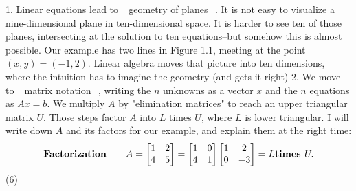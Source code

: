 1. Linear equations lead to _geometry of planes_. It is not easy to visualize a nine-dimensional plane in ten-dimensional space. It is harder to see ten of those planes, intersecting at the solution to ten equations--but somehow this is almost possible. Our example has two lines in Figure 1.1, meeting at the point \((x,y)=(-1,2)\). Linear algebra moves that picture into ten dimensions, where the intuition has to imagine the geometry (and gets it right)
2. We move to _matrix notation_, writing the \(n\) unknowns as a vector \(x\) and the \(n\) equations as \(Ax=b\). We multiply \(A\) by "elimination matrices" to reach an upper triangular matrix \(U\). Those steps factor \(A\) into \(L\) times \(U\), where \(L\) is lower triangular. I will write down \(A\) and its factors for our example, and explain them at the right time: \[\text{\bf Factorization}\qquad A=\begin{bmatrix}1&2\\ 4&5\end{bmatrix}=\begin{bmatrix}1&0\\ 4&1\end{bmatrix}\begin{bmatrix}1&2\\ 0&-3\end{bmatrix}=L\text{\bf times }U.\] (6) 